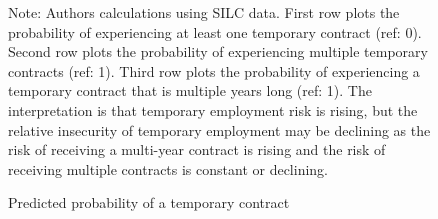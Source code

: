 \documentclass[12pt]{article}
\begin{document}
\clearpage
\begin{figure}
    \caption{Predicted probability of a temporary contract}
    \label{graph_glm_yhat}
    \footnotesize{Note: Authors calculations using SILC data.  First row plots the probability of experiencing at least one temporary contract (ref: 0).  Second row plots the probability of experiencing multiple temporary contracts (ref: 1).  Third row plots the probability of experiencing a temporary contract that is multiple years long (ref: 1).  The interpretation is that temporary employment risk is rising, but the relative insecurity of temporary employment may be declining as the risk of receiving a multi-year contract is rising and the risk of receiving multiple contracts is constant or declining.}
\end{figure}
\end{document}
